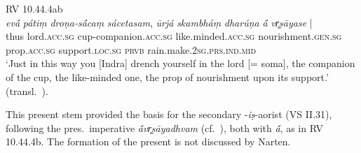 \documentclass[output=paper,colorlinks,citecolor=brown]{langscibook}
\begin{document}
\begin{exe}
    \ex RV 10.44.4ab\\ \gll \textit{evā́} \textit{pátiṃ} \textit{droṇa-sā́caṃ} \textit{sácetasam}, \textit{ūrjá} \textit{skambháṃ} \textit{dharúṇa} \textit{ā́} {\textit{vr̥ṣāyase}  |} \\
    thus lord.\textsc{acc.sg} cup-companion.\textsc{acc.sg} like.minded.\textsc{acc.sg} nourishment.\textsc{gen.sg} prop.\textsc{acc.sg} support.\textsc{loc.sg} \textsc{prvb} rain.make.\textsc{2sg.prs.ind.mid}\\
    \glt `Just in this way you [Indra] drench yourself in the lord [= soma], the companion of the cup, the like-minded one, the prop of nourishment upon its support.' (transl.\ \citealt[1449]{JamisonBrereton2014}).
\end{exe}



This present stem provided the basis for the secondary -\textit{iṣ}-aorist   (VS II.31), following the pres.\ imperative  \textit{ā́vr̥ṣāyadhvam} (cf.\  \citealt[62, 292]{Narten1964}), both with  \textit{ā́}, as in RV 10.44.4b. The formation of the present is not discussed by Narten.  
\end{document}
